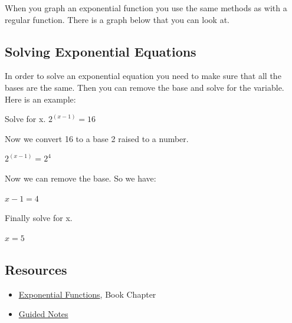 When you graph an exponential function you use the same methods as with a regular
function. There is a graph below that you can look at.







\subsection{Solving Exponential Equations}
\label{sss:solv-ba4a}




In order to solve an exponential equation you need to make sure that all the bases are the
same. Then you can remove the base and solve for the variable. Here is an example:



Solve for x. $2^{\left(x-1\right)} = 16\,$



Now we convert 16 to a base 2 raised to a number.



$2^{\left(x-1\right)} = 2^4\,$



Now we can remove the base. So we have:



$x-1 = 4\,$



Finally solve for x.



$x = 5\,$




\subsection{Resources}
\label{sss:reso-55b5}




\begin{itemize}
    \item \href{https://mathresearch.utsa.edu/wikiFiles/MAT1053/Exponential\%20Functions/MAT1053_M5.1Exponential_Functions.pdf}{Exponential Functions}, Book Chapter
    \item \href{https://mathresearch.utsa.edu/wikiFiles/MAT1053/Exponential\%20Functions/MAT1053_M5.1Exponential_FunctionsGN.pdf}{Guided Notes}
\end{itemize}


